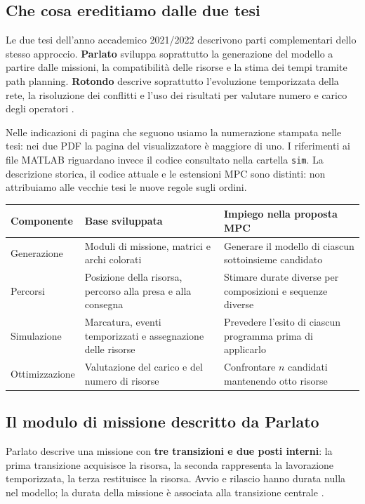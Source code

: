 ﻿\subsection{Che cosa ereditiamo dalle due tesi}

Le due tesi dell'anno accademico 2021/2022 descrivono parti complementari dello stesso approccio. \textbf{Parlato} sviluppa soprattutto la generazione del modello a partire dalle missioni, la compatibilità delle risorse e la stima dei tempi tramite path planning. \textbf{Rotondo} descrive soprattutto l'evoluzione temporizzata della rete, la risoluzione dei conflitti e l'uso dei risultati per valutare numero e carico degli operatori \cite[sezioni 2.3--2.5]{Parlato}\cite[sezioni 2.3--2.6]{Rotondo}.

Nelle indicazioni di pagina che seguono usiamo la numerazione stampata nelle tesi: nei due PDF la pagina del visualizzatore è maggiore di uno. I riferimenti ai file MATLAB riguardano invece il codice consultato nella cartella \texttt{sim}. La descrizione storica, il codice attuale e le estensioni MPC sono distinti: non attribuiamo alle vecchie tesi le nuove regole sugli ordini.

\begin{center}
\small
\begin{tabularx}{\linewidth}{@{}p{2.4cm}XX@{}}
\toprule
Componente & Base sviluppata & Impiego nella proposta MPC\\
\midrule
Generazione & Moduli di missione, matrici e archi colorati & Generare il modello di ciascun sottoinsieme candidato\\
Percorsi & Posizione della risorsa, percorso alla presa e alla consegna & Stimare durate diverse per composizioni e sequenze diverse\\
Simulazione & Marcatura, eventi temporizzati e assegnazione delle risorse & Prevedere l'esito di ciascun programma prima di applicarlo\\
Ottimizzazione & Valutazione del carico e del numero di risorse & Confrontare $n$ candidati mantenendo otto risorse\\
\bottomrule
\end{tabularx}
\end{center}

\subsection{Il modulo di missione descritto da Parlato}

Parlato descrive una missione con \textbf{tre transizioni e due posti interni}: la prima transizione acquisisce la risorsa, la seconda rappresenta la lavorazione temporizzata, la terza restituisce la risorsa. Avvio e rilascio hanno durata nulla nel modello; la durata della missione è associata alla transizione centrale \cite[sezione 2.3.2, pp. 19--22, figure 2.5--2.8]{Parlato}.


